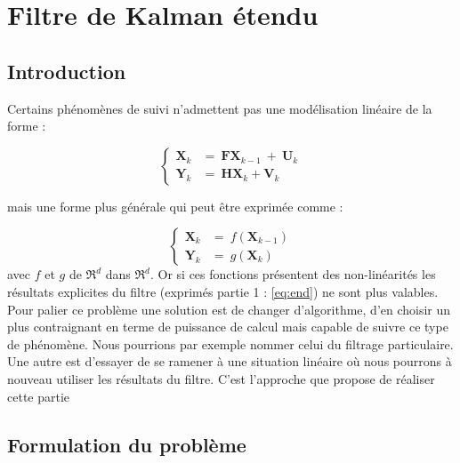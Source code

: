 \newpage

\section{Filtre de Kalman étendu}

\subsection{Introduction}
Certains phénomènes de suivi n’admettent pas une modélisation linéaire de la forme :

\begin{equation}
	\begin{cases}
		\hline
		\mathbf{X}_{k} & =\ \mathbf{FX}_{k-1} \ +\ \mathbf{U}_{k}\\
		\mathbf{Y}_{k} & =\ \mathbf{HX}_{k} +\mathbf{V}_{k}
	\end{cases}
\end{equation}

mais une forme plus générale qui peut être exprimée comme :

\begin{equation}
	\begin{cases}
		\hline
		\mathbf{X}_{k} & =\ f(\mathbf{X}_{k-1})\\
		\mathbf{Y}_{k} & =\ g(\mathbf{X}_{k})
	\end{cases}
\end{equation}
avec $\displaystyle f$ et $\displaystyle g$ de $\displaystyle \Re ^{d}$ dans $\displaystyle \Re ^{d}$.
\newline
Or si ces fonctions présentent des non-linéarités les résultats explicites du filtre (exprimés partie
1 : \ref{eq:end}) ne sont plus valables. Pour palier ce problème une solution est de changer d’algorithme, d’en choisir un plus contraignant en terme de puissance de calcul mais capable de suivre ce type de phénomène. Nous pourrions par exemple nommer celui du filtrage particulaire. Une autre est d’essayer de se ramener à une situation linéaire où nous pourrons à nouveau utiliser les résultats du filtre. C’est l’approche que propose de réaliser cette partie

\subsection{Formulation du problème}

